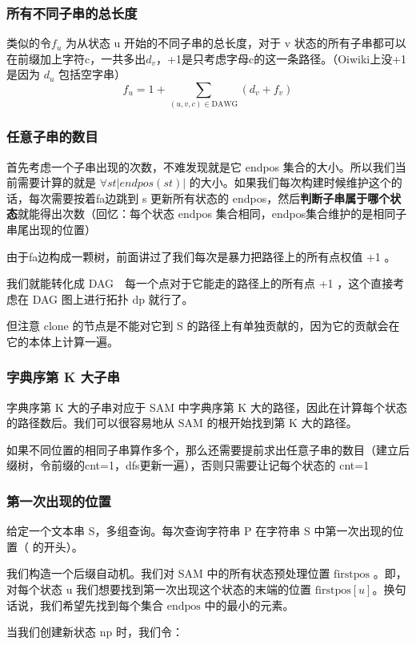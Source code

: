 \subsubsection{所有不同子串的总长度}

\par \noindent 类似的令$f_u$ 为从状态 u 开始的不同子串的总长度，对于 v 状态的所有子串都可以在前缀加上字符c，一共多出$d_v$，+1是只考虑字母c的这一条路径。（Oiwiki上没+1是因为 $d_u$ 包括空字串）
$$
f_u=1+\sum_{(u,v,c)\in\text{DAWG}} (d_v+f_v)
$$
\subsubsection{任意子串的数目}
\par \noindent 首先考虑一个子串出现的次数，不难发现就是它 endpos 集合的大小。所以我们当前需要计算的就是 $\forall st|endpos(st)|$ 的大小。如果我们每次构建时候维护这个的话，每次需要按着fa边跳到 s 更新所有状态的 endpos，然后\textbf{判断子串属于哪个状态}就能得出次数（回忆：每个状态 endpos 集合相同，endpos集合维护的是相同子串尾出现的位置）

\par \noindent 由于fa边构成一颗树，前面讲过了我们每次是暴力把路径上的所有点权值 +1 。
\par \noindent 我们就能转化成 DAG　每一个点对于它能走的路径上的所有点 +1 ，这个直接考虑在 DAG 图上进行拓扑 dp 就行了。
~\\
\par \noindent 但注意 $\text{clone}$ 的节点是不能对它到 S 的路径上有单独贡献的，因为它的贡献会在它的本体上计算一遍。
\subsubsection{字典序第 K 大子串}

\par \noindent 字典序第 K 大的子串对应于 SAM 中字典序第 K 大的路径，因此在计算每个状态的路径数后。我们可以很容易地从 SAM 的根开始找到第 K 大的路径。
~\\
\par \noindent 如果不同位置的相同子串算作多个，那么还需要提前求出任意子串的数目（建立后缀树，令前缀的cnt=1，dfs更新一遍），否则只需要让记每个状态的 cnt=1
\subsubsection{第一次出现的位置}

\begin{tcolorbox}
给定一个文本串 S，多组查询。每次查询字符串 P 在字符串 S 中第一次出现的位置（ 的开头）。
\end{tcolorbox}
\par \noindent 我们构造一个后缀自动机。我们对 SAM 中的所有状态预处理位置 $\text{firstpos}$ 。即，对每个状态 u 我们想要找到第一次出现这个状态的末端的位置 $\text{firstpos}[u]$。换句话说，我们希望先找到每个集合 $\text{endpos}$ 中的最小的元素。
~\\
\par \noindent 当我们创建新状态 np 时，我们令：

